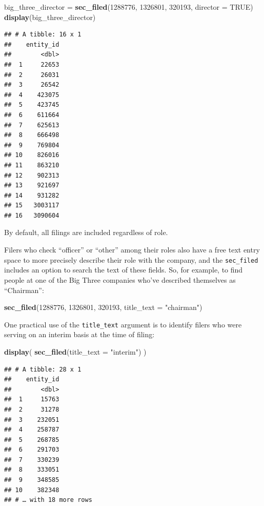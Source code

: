 \documentclass[]{book}
\newenvironment{Shaded}{\begin{snugshade}}{\end{snugshade}}
\newcommand{\DataTypeTok}[1]{\textcolor[rgb]{0.13,0.29,0.53}{#1}}
\newcommand{\DecValTok}[1]{\textcolor[rgb]{0.00,0.00,0.81}{#1}}
\newcommand{\KeywordTok}[1]{\textcolor[rgb]{0.13,0.29,0.53}{\textbf{#1}}}
\newcommand{\NormalTok}[1]{#1}
\newcommand{\OtherTok}[1]{\textcolor[rgb]{0.56,0.35,0.01}{#1}}
\newcommand{\StringTok}[1]{\textcolor[rgb]{0.31,0.60,0.02}{#1}}
\begin{document}
\begin{Shaded}
\begin{Highlighting}[]
\NormalTok{big_three_director =}\StringTok{ }\KeywordTok{sec_filed}\NormalTok{(}\DecValTok{1288776}\NormalTok{, }\DecValTok{1326801}\NormalTok{, }\DecValTok{320193}\NormalTok{, }\DataTypeTok{director =} \OtherTok{TRUE}\NormalTok{)}
\KeywordTok{display}\NormalTok{(big_three_director)}
\end{Highlighting}
\end{Shaded}

\begin{verbatim}
## # A tibble: 16 x 1
##    entity_id
##        <dbl>
##  1     22653
##  2     26031
##  3     26542
##  4    423075
##  5    423745
##  6    611664
##  7    625613
##  8    666498
##  9    769804
## 10    826016
## 11    863210
## 12    902313
## 13    921697
## 14    931282
## 15   3003117
## 16   3090604
\end{verbatim}

By default, all filings are included regardless of role.

Filers who check ``officer'' or ``other'' among their roles also have a free text entry space to more precisely describe their role with the company, and the \texttt{sec\_filed} includes an option to search the text of these fields. So, for example, to find people at one of the Big Three companies who've described themselves as ``Chairman'':

\begin{Shaded}
\begin{Highlighting}[]
\KeywordTok{sec_filed}\NormalTok{(}\DecValTok{1288776}\NormalTok{, }\DecValTok{1326801}\NormalTok{, }\DecValTok{320193}\NormalTok{, }\DataTypeTok{title_text =} \StringTok{"chairman"}\NormalTok{)}
\end{Highlighting}
\end{Shaded}

One practical use of the \texttt{title\_text} argument is to identify filers who were serving on an interim basis at the time of filing:

\begin{Shaded}
\begin{Highlighting}[]
\KeywordTok{display}\NormalTok{( }\KeywordTok{sec_filed}\NormalTok{(}\DataTypeTok{title_text =} \StringTok{"interim"}\NormalTok{) )}
\end{Highlighting}
\end{Shaded}

\begin{verbatim}
## # A tibble: 28 x 1
##    entity_id
##        <dbl>
##  1     15763
##  2     31278
##  3    232051
##  4    258787
##  5    268785
##  6    291703
##  7    330239
##  8    333051
##  9    348585
## 10    382348
## # … with 18 more rows
\end{verbatim}
\end{document}
